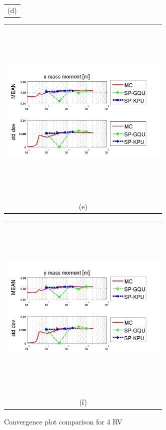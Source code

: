 \documentclass{article}
\newcommand{\Pic}[2][0.85]{\begin{center}\texttt{[image: \#2]}
 \end{center} }
\begin{document}
\begin{figure}[H]
\begin{minipage}[c]{0.6\textwidth}
\begin{tabular}{c}
        (d)
        \end{tabular}
    \end{minipage}    
     \begin{minipage}{0.6\textwidth}
        \begin{tabular}{c}
	\includegraphics[width=8cm,height=9cm,keepaspectratio]{fig/pics4rv/cinci4rv.jpg}\\
        (e)
        \end{tabular}
    \end{minipage}
   \begin{minipage}[c]{0.6\textwidth}
       \begin{tabular}{c}
       \includegraphics[width=8cm,height=9cm,keepaspectratio]{fig/pics4rv/sase4rv.jpg}\\
        (f)
        \end{tabular}
    \end{minipage}
\caption{ Convergence plot comparison for 4 RV }
\label{fig7}  
\end{figure}

	
%	
	
\end{document}
